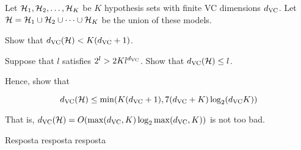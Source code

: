\begin{enunciado}{14}
    Let $\mathcal{H}_1, \mathcal{H}_2, \dots, \mathcal{H}_K$ be $K$ hypothesis sets with finite VC dimensions $d_{\text{VC}}$. Let $\mathcal{H} = \mathcal{H}_1 \cup \mathcal{H}_2 \cup \dots \cup \mathcal{H}_K$ be the union of these models.
    
     Show that $d_{\text{VC}}(\mathcal{H}) < K(d_{\text{VC}} + 1)$.
    
     Suppose that $l$ satisfies $2^l > 2Kl^{d_{\text{VC}}}$. Show that $d_{\text{VC}}(\mathcal{H}) \le l$.
    
     Hence, show that
    
    $$ d_{\text{VC}}(\mathcal{H}) \le \min(K(d_{\text{VC}} + 1), 7(d_{\text{VC}} + K)\log_2(d_{\text{VC}} K)) $$
    
    That is, $d_{\text{VC}}(\mathcal{H}) = O(\max(d_{\text{VC}}, K)\log_2 \max(d_{\text{VC}}, K))$ is not too bad.
\end{enunciado}

Resposta resposta resposta
